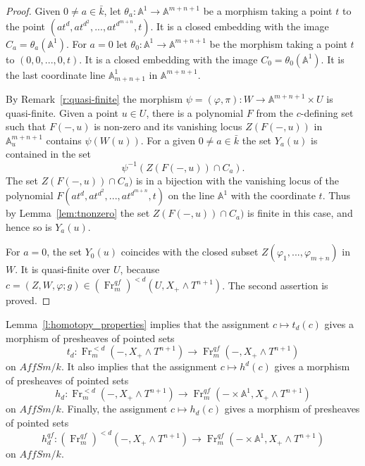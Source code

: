 \documentclass[a4paper,11pt,reqno]{amsart}
\begin{document}
\begin{proof}
Given $0\neq a\in \bar k$, let $\theta_a: {\mathbb{A}}^1\to {\mathbb{A}}^{m+n+1}$ be a
morphism taking a point $t$ to the point
$(at^d,at^{d^2},...,at^{d^{m+n}},t)$. It is a closed embedding with
the image $C_a=\theta_a({\mathbb{A}}^1)$. For $a=0$ let $\theta_0: {\mathbb{A}}^1\to
{\mathbb{A}}^{m+n+1}$ be the morphism taking a point $t$ to $(0,0,...,0,t)$.
It is a closed embedding with the image $C_0=\theta_0({\mathbb{A}}^1)$. It is
the last coordinate line ${\mathbb{A}}^1_{m+n+1}$ in ${\mathbb{A}}^{m+n+1}$.

By Remark~\ref{r:quasi-finite} the morphism $\psi=({\varphi},\pi):W\to
{\mathbb{A}}^{m+n+1}\times U$ is quasi-finite. Given a point $u\in U$, there
is a polynomial $F$ from the $c$-defining set such that $F(-,u)$ is
non-zero and its vanishing locus $Z(F(-,u))$ in ${\mathbb{A}}^{m+n+1}_u$
contains $\psi(W(u))$. For a given $0\neq a\in \bar k$ the set
$Y_a(u)$ is contained in the set
   $$\psi^{-1}(Z(F(-,u))\cap C_a).$$
The set $Z(F(-,u))\cap C_a)$ is in a bijection with the vanishing
locus of the polynomial $F(at^d,at^{d^2},...,at^{d^{m+n}},t)$ on the
line ${\mathbb{A}}^1$ with the coordinate $t$. Thus by
Lemma~\ref{lem:tnonzero} the set $Z(F(-,u))\cap C_a)$ is finite in
this case, and hence so is $Y_a(u)$.

For $a=0$, the set $Y_0(u)$ coincides with the closed subset
$Z({\varphi}_1,...,{\varphi}_{m+n})$ in $W$. It is quasi-finite over $U$,
because $c=(Z,W,{\varphi};g) \in ({\operatorname{Fr}}^{qf}_m)^{<d}(U,X_+\wedge T^{n+1})$.
The second assertion is proved.
\end{proof}

Lemma~\ref{l:homotopy_properties} implies that the assignment
$c\mapsto t_d(c)$ gives a morphism of presheaves of pointed sets
   $$t_d: {\operatorname{Fr}}^{<d}_m(-,X_+\wedge T^{n+1}) \to {\operatorname{Fr}}^{qf}_m(-,X_+\wedge T^{n+1})$$
on $AffSm/k$. It also implies that the assignment $c\mapsto h^d(c)$
gives a morphism of presheaves of pointed sets
   $$h_d: {\operatorname{Fr}}^{<d}_m(-,X_+\wedge T^{n+1}) \to {\operatorname{Fr}}^{qf}_m(-\times {\mathbb{A}}^1,X_+\wedge T^{n+1})$$
on $AffSm/k$. Finally, the assignment $c\mapsto h_d(c)$ gives a
morphism of presheaves of pointed sets
   $$h_{d}^{qf}:({\operatorname{Fr}}^{qf}_m)^{<d}(-,X_+\wedge T^{n+1}) \to {\operatorname{Fr}}^{qf}_m(-\times {\mathbb{A}}^1,X_+\wedge T^{n+1})$$
on $AffSm/k$.
\end{document}
